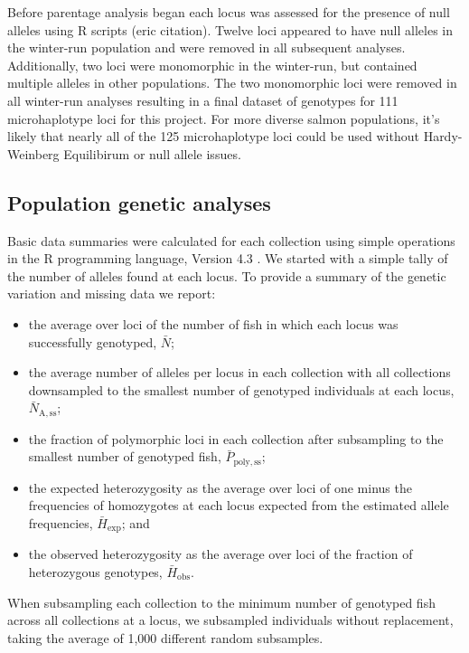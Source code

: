 Before parentage analysis began each locus was assessed for the presence of null alleles using R scripts (eric citation). Twelve loci appeared to have null alleles in the winter-run population and were removed in all subsequent analyses. Additionally, two loci were monomorphic in the winter-run, but contained multiple alleles in other populations. The two monomorphic loci were removed in all winter-run analyses resulting in a final dataset of genotypes for 111 microhaplotype loci for this project. For more diverse salmon populations, it's likely that nearly all of the 125 microhaplotype loci could be used without Hardy-Weinberg Equilibirum or null allele issues.


\subsection*{Population genetic analyses}

Basic data summaries were calculated for each collection
using simple operations in the R programming language, Version 4.3
\citep{rcore}. We started with a simple tally of the number of alleles
found at each locus.  To provide a summary of the genetic variation and
missing data we report:
\begin {itemize}
\item the average over loci of the number of fish
in which each locus was successfully genotyped, $\bar{N}$;
\item the average number of alleles per locus in each collection with all collections
downsampled to the smallest number of genotyped individuals at each
locus, $\bar{N}_\mathrm{A,ss}$;
\item the fraction of polymorphic
loci in each collection after subsampling to the smallest number of genotyped
fish, $\bar{P}_\mathrm{poly,ss}$;
\item the expected heterozygosity as the average over loci
of one minus the frequencies of homozygotes at each locus expected from the
estimated allele frequencies, $\bar{H}_\mathrm{exp}$; and 
\item the observed heterozygosity as the average over
loci of the fraction of heterozygous genotypes, $\bar{H}_\mathrm{obs}$.
\end{itemize}
When subsampling each collection to the minimum number of genotyped
fish across all collections at a locus, we subsampled individuals without
replacement, taking the average of 1,000 different random subsamples.  

